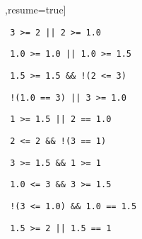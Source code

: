 \begin{exercise}
\begin{sltasks}[counter-format=2.tsk[1],resume=true]
\begin{items}
    \item \texttt{ 3 >= 2 || 2 >= 1.0 }
    \item \texttt{ 1.0 >= 1.0 || 1.0 >= 1.5 }
    \item \texttt{ 1.5 >= 1.5 \&\& !(2 <= 3) }
    \item \texttt{ !(1.0 == 3) || 3 >= 1.0 }
    \item \texttt{ 1 >= 1.5 || 2 == 1.0 }
  \end{items}
  \task
  \begin{items}
    \item \texttt{ 2 <= 2 \&\& !(3 == 1) }
    \item \texttt{ 3 >= 1.5 \&\& 1 >= 1 }
    \item \texttt{ 1.0 <= 3 \&\& 3 >= 1.5 }
    \item \texttt{ !(3 <= 1.0) \&\& 1.0 == 1.5 }
    \item \texttt{ 1.5 >= 2 || 1.5 == 1 }
  \end{items}
\end{sltasks}
\end{exercise}

